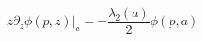 \begin{equation}
z \partial_z\phi(p,z)\Big|_a=-\frac {\lambda_2(a)} 2 \phi(p,a)
\label{bcapp}
\end{equation}

